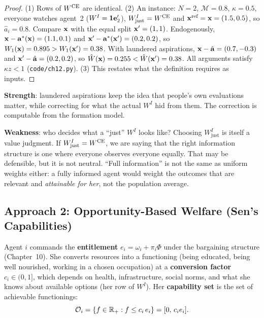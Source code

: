 \documentclass[../structural_economics_book.tex]{subfiles}
\begin{document}
\begin{proof}
(1) Rows of $W^{\text{CE}}$ are identical. (2) An instance: $N = 2$, $\mathcal{M} = 0.8$, $\kappa = 0.5$, everyone watches agent~2 ($W^I = \mathbf{1}\mathbf{e}_2'$), $W^I_{\text{just}} = W^{\text{CE}}$ and $\mathbf{x}^{\text{ref}} = \mathbf{x} = (1.5, 0.5)$, so $\hat{a}_i = 0.8$. Compare $\mathbf{x}$ with the equal split $\mathbf{x}' = (1, 1)$. Endogenously, $\mathbf{x} - \mathbf{a}^*(\mathbf{x}) = (1.1, 0.1)$ and $\mathbf{x}' - \mathbf{a}^*(\mathbf{x}') = (0.2, 0.2)$, so $W_1(\mathbf{x}) = 0.895 > W_1(\mathbf{x}') = 0.38$. With laundered aspirations, $\mathbf{x} - \hat{\mathbf{a}} = (0.7, -0.3)$ and $\mathbf{x}' - \hat{\mathbf{a}} = (0.2, 0.2)$, so $\hat{W}(\mathbf{x}) = 0.255 < \hat{W}(\mathbf{x}') = 0.38$. All arguments satisfy $\kappa z < 1$ (\texttt{code/ch12.py}). (3) This restates what the definition requires as inputs.
\end{proof}

\begin{intuition}
\textbf{Strength}: laundered aspirations keep the idea that people's own evaluations matter, while correcting for what the actual $W^I$ hid from them. The correction is computable from the formation model.

\textbf{Weakness}: who decides what a ``just'' $W^I$ looks like? Choosing $W^I_{\text{just}}$ is itself a value judgment. If $W^I_{\text{just}} = W^{\text{CE}}$, we are saying that the right information structure is one where everyone observes everyone equally. That may be defensible, but it is not neutral. ``Full information'' is not the same as uniform weights either: a fully informed agent would weight the outcomes that are relevant and \textit{attainable for her}, not the population average.
\end{intuition}


\subsection{Approach 2: Opportunity-Based Welfare (Sen's Capabilities)}

\begin{definition}\label{ch12:def:capability}
Agent $i$ commands the \textbf{entitlement} $e_i = \omega_i + \pi_i\Phi$ under the bargaining structure (Chapter~10). She converts resources into a functioning (being educated, being well nourished, working in a chosen occupation) at a \textbf{conversion factor} $c_i \in (0, 1]$, which depends on health, infrastructure, social norms, and what she knows about available options (her row of $W^I$). Her \textbf{capability set} is the set of achievable functionings:
\begin{equation}\label{ch12:eq:capability}
\mathcal{O}_i = \{f \in \mathbb{R}_+ : f \le c_i\,e_i\} = [0,\, c_i e_i].
\end{equation}
\end{definition}
\end{document}
